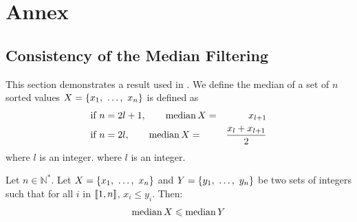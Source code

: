 \appendix{}
\chapter{Annex}\label{chap:annex}
\section{Consistency of the Median Filtering}
This section demonstrates a result used in . We define the median of a set of $n$ sorted values $X=\{x_1, ~\dots, ~ x_n\}$ is defined as
    \begin{align}
        &\text{if }n=2l+1,\qquad \operatorname*{median} X =& x_{l+1}\\
        &\text{if }n=2l,\qquad \operatorname*{median} X =& \frac{x_{l}+x_{l+1}}{2}
    \end{align}
    where $l$ is an integer.
where $l$ is an integer.

\begin{proposition}\label{prop:median_consistency}
    Let $n\in\mathbb{N}^*$. Let $X=\{x_1, ~\dots, ~ x_n\}$ and $Y=\{y_1, ~\dots, ~ y_n\}$ be two sets of integers such that for all $i$ in $[\![1,n]\!]$, $x_i\leqslant y_i$. Then:
    \begin{align}
        \operatorname*{median} X \leqslant \operatorname*{median} Y
    \end{align}
\end{proposition}

